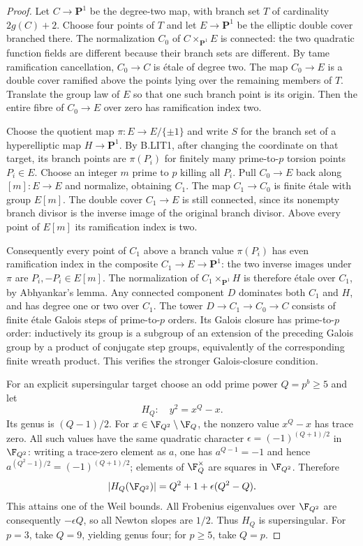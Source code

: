\begin{proof}
Let $C\to\mathbf P^1$ be the degree-two map, with branch set $T$
of cardinality $2g(C)+2$. Choose four points of $T$ and let
$E\to\mathbf P^1$ be the elliptic double cover branched there.
The normalization $C_0$ of $C\times_{\mathbf P^1}E$ is connected:
the two quadratic function fields are different because their
branch sets are different. By tame ramification cancellation,
$C_0\to C$ is \'etale of degree two. The map $C_0\to E$ is a
double cover ramified above the points lying over the remaining
members of $T$. Translate the group law of $E$ so that one such
branch point is its origin. Then the entire fibre of $C_0\to E$
over zero has ramification index two.

Choose the quotient map $\pi:E\to E/\{\pm1\}$ and write $S$
for the branch set of a hyperelliptic map $H\to\mathbf P^1$.
By B.LIT1, after changing the coordinate on that target, its branch
points are $\pi(P_i)$ for finitely many prime-to-$p$ torsion points
$P_i\in E$. Choose an integer $m$ prime to $p$ killing all $P_i$.
Pull $C_0\to E$ back along $[m]:E\to E$ and normalize, obtaining
$C_1$. The map $C_1\to C_0$ is finite \'etale with group $E[m]$.
The double cover $C_1\to E$ is still connected, since its nonempty
branch divisor is the inverse image of the original branch divisor.
Above every point of $E[m]$ its ramification index is two.

Consequently every point of $C_1$ above a branch value $\pi(P_i)$
has even ramification index in the composite $C_1\to E\to\mathbf P^1$:
the two inverse images under $\pi$ are $P_i,-P_i\in E[m]$.
The normalization of $C_1\times_{\mathbf P^1}H$ is therefore
\'etale over $C_1$, by Abhyankar's lemma. Any connected component
$D$ dominates both $C_1$ and $H$, and has degree one or two over
$C_1$. The tower $D\to C_1\to C_0\to C$ consists of finite
\'etale Galois steps of prime-to-$p$ orders. Its Galois closure has
prime-to-$p$ order: inductively its group is a subgroup of an
extension of the preceding Galois group by a product of conjugate
step groups, equivalently of the corresponding finite wreath
product. This verifies the stronger Galois-closure condition.

For an explicit supersingular target choose an odd prime power
$Q=p^b\ge5$ and let
\[
 H_Q:\quad y^2=x^Q-x.
\]
Its genus is $(Q-1)/2$. For $x\in\F_{Q^2}\setminus\F_Q$, the
nonzero value $x^Q-x$ has trace zero. All such values have the same
quadratic character
$\epsilon=(-1)^{(Q+1)/2}$ in $\F_{Q^2}$: writing a trace-zero
element as $a$, one has $a^{Q-1}=-1$ and hence
$a^{(Q^2-1)/2}=(-1)^{(Q+1)/2}$; elements of $\F_Q^\times$ are
squares in $\F_{Q^2}$. Therefore
\[
 |H_Q(\F_{Q^2})|=Q^2+1+\epsilon(Q^2-Q).
\]
This attains one of the Weil bounds. All Frobenius eigenvalues
over $\F_{Q^2}$ are consequently $-\epsilon Q$, so all Newton
slopes are $1/2$. Thus $H_Q$ is supersingular. For $p=3$, take
$Q=9$, yielding genus four; for $p\ge5$, take $Q=p$.
\end{proof}

